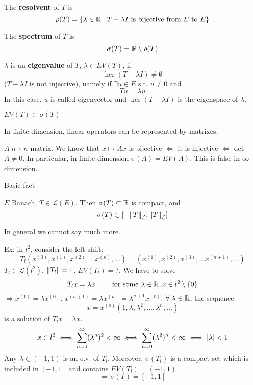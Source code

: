 \begin{definition}
    The \textbf{resolvent} of \(T\) is 
    \[
        \rho(T) = \{ \lambda \in \mathbb{R}: T - \lambda I \text{ is bijective from } E \text{ to } E\}
    \]
\end{definition}
\begin{definition}
    The \textbf{spectrum} of \(T\) is    
    \[
        \sigma(T) = \mathbb{R} \setminus \rho(T)
    \]
\end{definition}
\begin{definition}
    \(\lambda\) is an \textbf{eigenvalue} of \(T\), \(\lambda \in EV(T) \), if 
    \[
        \ker(T- \lambda I) \neq \emptyset
    \]
    (\(T - \lambda I\) is not injective), namely if \(\exists u \in E\) s.t. \(u \neq 0\) and
    \[
        T u = \lambda u
    \]
    In this case, \(u\) is called eigenvector and \(\ker(T-\lambda I)\) is the eigenspace of \(\lambda\).
\end{definition}
\begin{remark}
    \(EV(T) \subset \sigma(T)\)
\end{remark}
\begin{remark}
    In finite dimension, linear operators can be represented by matrixes.

    \(A \; n \times n\) matrix. We know that \(x \mapsto Ax\) is bijective \(\iff \) it is injective \(\iff \) det\(A \neq 0\). In particular, in finite dimension \(\sigma(A) = EV(A)\). This is false in \(\infty \) dimension.
\end{remark}

Basic fact
\begin{theorem}
    \(E\) Banach, \(T \in \mathcal{L}(E)\). Then \(\sigma(T) \subset \mathbb{R}\) is compact, and 
    \[
        \sigma(T) \subset \left[ - \norm{T}_\mathcal{L}, \norm{T}_\mathcal{L} \right]
    \]
\end{theorem}

In general we cannot say much more.

Ex: in \(l^2\), consider the left shift:
\[
    T_l(x^{(0)}, x^{(1)}, x^{(2)},... x^{(n)},...) = (x^{(1)}, x^{(2)}, x^{(3)},... x^{(n+1)},...)
\]
\(T_l \in \mathcal{L}(l^2)\), \(\norm{T_l}=1\). \(EV(T_l)=?\). We have to solve
\[
    T_l x = \lambda x \qquad \text{ for some } \lambda \in \mathbb{R}, x \in l^2 \setminus \{0\}
\]
\(\Rightarrow x^{(1)}=\lambda x^{(0)}\). \(x^{(n+1)} = \lambda x^{(n)} = \lambda^{n+1} x^{(0)}\). \(\forall \; \lambda \in \mathbb{R}\), the sequence
\[
    x = x^{(0)} \left(1, \lambda,\lambda^2, ..., \lambda^n, ...\right)
\]
is a solution of \(T_l x = \lambda x\).
\[
    x \in l^2 \iff \sum_{n=0}^\infty (\lambda^n)^2 < \infty \iff \sum_{n=0}^\infty (\lambda^2)^n < \infty \iff \abs{\lambda} < 1
\]
Any \(\lambda \in (-1, 1)\) is an e.v. of \(T_l\). Moreover, \(\sigma(T_l)\) is a compact set which is included in \([-1, 1]\) and contains \(EV(T_l) =(-1, 1)\)
\[
    \Rightarrow \sigma(T) = [-1, 1]
\]
